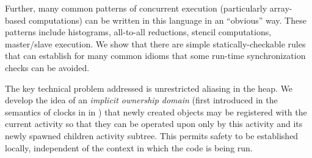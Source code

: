 Further, many common patterns of concurrent execution (particularly
array-based computations) can be written in this language in an
``obvious'' way. These patterns include histograms, all-to-all
reductions, stencil computations, master/slave execution.  We show
that there are simple statically-checkable rules that can establish
for many common idioms that some run-time synchronization checks can
be avoided.

The key technical problem addressed is unrestricted aliasing in the
heap.  We develop the idea of an {\em implicit ownership domain}
(first introduced in the semantics of clocks in \Xten{} in
\cite{vj-clock}) that newly created objects may be registered with
the current activity so that they can be operated upon only by this
activity and its newly spawned children activity subtree.  This
permits safety to be established locally, independent of the context
in which the code is being run.
